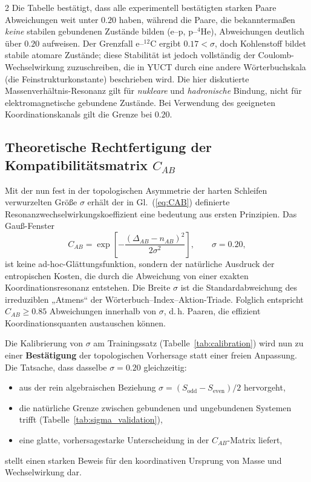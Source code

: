 \documentclass[11pt,a4paper]{article}
\begin{document}
\begin{multicols}{2}
		Die Tabelle bestätigt, dass alle experimentell bestätigten starken Paare Abweichungen weit unter $0.20$ haben, während die Paare, die bekanntermaßen \emph{keine} stabilen gebundenen Zustände bilden (e--p, p--$^4$He), Abweichungen deutlich über $0.20$ aufweisen. Der Grenzfall e--$^{12}$C ergibt $0.17 < \sigma$, doch Kohlenstoff bildet stabile atomare Zustände; diese Stabilität ist jedoch vollständig der Coulomb-Wechselwirkung zuzuschreiben, die in YUCT durch eine andere Wörterbuchskala (die Feinstrukturkonstante) beschrieben wird. Die hier diskutierte Massenverhältnis-Resonanz gilt für \textit{nukleare} und \textit{hadronische} Bindung, nicht für elektromagnetische gebundene Zustände. Bei Verwendung des geeigneten Koordinationskanals gilt die Grenze bei $0.20$.
		
		\subsection{Theoretische Rechtfertigung der Kompatibilitätsmatrix \(C_{AB}\)}
		
		Mit der nun fest in der topologischen Asymmetrie der harten Schleifen verwurzelten Größe $\sigma$ erhält der in Gl.~(\ref{eq:CAB}) definierte Resonanzwechselwirkungskoeffizient eine bedeutung aus ersten Prinzipien. Das Gauß-Fenster
		\[
		C_{AB} = \exp\!\left[ -\frac{(\Delta_{AB} - n_{AB})^2}{2\sigma^2} \right],\qquad \sigma = 0.20,
		\]
		ist keine ad-hoc-Glättungsfunktion, sondern der natürliche Ausdruck der entropischen Kosten, die durch die Abweichung von einer exakten Koordinationsresonanz entstehen. Die Breite $\sigma$ ist die Standardabweichung des irreduziblen „Atmens“ der Wörterbuch–Index–Aktion-Triade. Folglich entspricht $C_{AB} \ge 0.85$ Abweichungen innerhalb von $\sigma$, d. h. Paaren, die effizient Koordinationsquanten austauschen können.
		
		Die Kalibrierung von $\sigma$ am Trainingssatz (Tabelle~\ref{tab:calibration}) wird nun zu einer \textbf{Bestätigung} der topologischen Vorhersage statt einer freien Anpassung. Die Tatsache, dass dasselbe $\sigma = 0.20$ gleichzeitig:
		\begin{itemize}
			\item aus der rein algebraischen Beziehung $\sigma = (S_{\mathrm{odd}} - S_{\mathrm{even}})/2$ hervorgeht,
			\item die natürliche Grenze zwischen gebundenen und ungebundenen Systemen trifft (Tabelle~\ref{tab:sigma_validation}),
			\item eine glatte, vorhersagestarke Unterscheidung in der $C_{AB}$-Matrix liefert,
		\end{itemize}
		stellt einen starken Beweis für den koordinativen Ursprung von Masse und Wechselwirkung dar.
		

\end{multicols}
\end{document}
